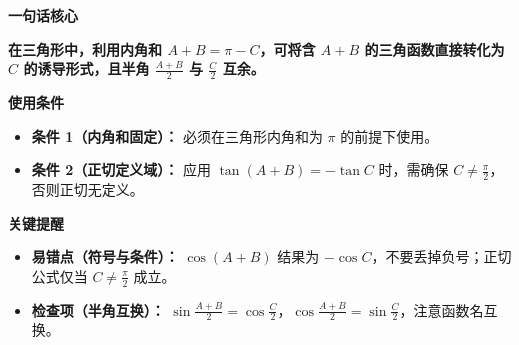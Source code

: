 \begin{summarybox}
	\textbf{\textcolor{CSummary}{一句话核心}}

	\textbf{在三角形中，利用内角和 $A+B = \pi - C$，可将含 $A+B$ 的三角函数直接转化为 $C$ 的诱导形式，且半角 $\frac{A+B}{2}$ 与 $\frac{C}{2}$ 互余。}

	\medskip
	\textbf{\textcolor{CSummary}{使用条件}}
	\begin{itemize}[leftmargin=*, itemsep=0.5em, topsep=0.4em]
		\item \textbf{条件 1（内角和固定）：} 必须在三角形内角和为 $\pi$ 的前提下使用。
		\item \textbf{条件 2（正切定义域）：} 应用 $\tan(A+B)=-\tan C$ 时，需确保 $C \neq \frac{\pi}{2}$，否则正切无定义。
	\end{itemize}

	\medskip
	\textbf{\textcolor{CSummary}{关键提醒}}
	\begin{itemize}[leftmargin=*, itemsep=0.5em, topsep=0.4em]
		\item \textbf{易错点（符号与条件）：} $\cos(A+B)$ 结果为 $-\cos C$，不要丢掉负号；正切公式仅当 $C \neq \frac{\pi}{2}$ 成立。
		\item \textbf{检查项（半角互换）：} $\sin\frac{A+B}{2} = \cos\frac{C}{2}$，$\cos\frac{A+B}{2} = \sin\frac{C}{2}$，注意函数名互换。
	\end{itemize}
\end{summarybox}
